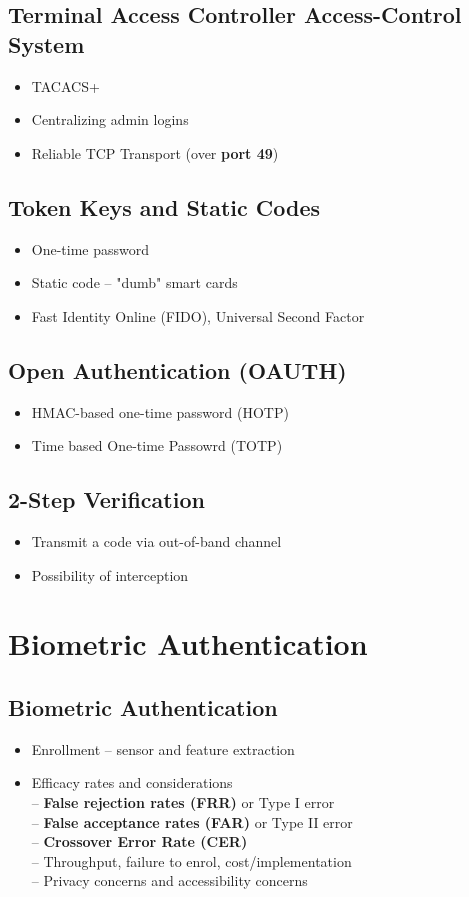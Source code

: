 	\subsection{Terminal Access Controller Access-Control System}
		\begin{itemize}
			\item TACACS+
			\item Centralizing admin logins
			\item Reliable TCP Transport (over \textbf{port 49})
		\end{itemize}
	\subsection{Token Keys and Static Codes}
		\begin{itemize}
			\item One-time password
			\item Static code -- "dumb" smart cards
			\item Fast Identity Online (FIDO), Universal Second Factor
		\end{itemize}
	\subsection{Open Authentication (OAUTH)}
		\begin{itemize}
			\item HMAC-based one-time password (HOTP)
			\item Time based One-time Passowrd (TOTP)
		\end{itemize}
	\subsection{2-Step Verification}
		\begin{itemize}
			\item Transmit a code via out-of-band channel
			\item Possibility of interception
		\end{itemize}

\section{Biometric Authentication}
	\subsection{Biometric Authentication}
		\begin{itemize}
			\item Enrollment -- sensor and feature extraction
			\item Efficacy rates and considerations \\
				-- \textbf{False rejection rates (FRR)} or Type I error \\
				-- \textbf{False acceptance rates (FAR)} or Type II error \\
				-- \textbf{Crossover Error Rate (CER)} \\
				-- Throughput, failure to enrol, cost/implementation \\
				-- Privacy concerns and accessibility concerns
		\end{itemize}
